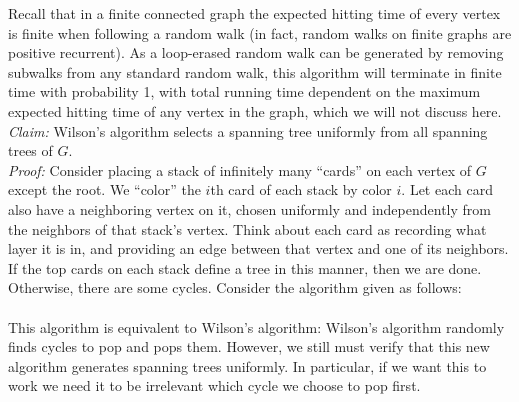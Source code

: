 \documentclass{article}
\begin{document}
	Recall that in a finite connected graph the expected hitting time of every vertex is finite when following a random walk (in fact, random walks on finite graphs are positive recurrent). As a loop-erased random walk can be generated by removing subwalks from any standard random walk, this algorithm will terminate in finite time with probability 1, with total running time dependent on the maximum expected hitting time of any vertex in the graph, which we will not discuss here. \\
	
	\textit{Claim:} Wilson's algorithm selects a spanning tree uniformly from all spanning trees of $G$.  \\ 
	
	\textit{Proof:} Consider placing a stack of infinitely many ``cards'' on each vertex of $G$ except the root. We ``color'' the $i$th card of each stack by color $i$. Let each card also have a neighboring vertex on it, chosen uniformly and independently from the neighbors of that stack's vertex. Think about each card as recording what layer it is in, and providing an edge between that vertex and one of its neighbors. \\ 
	
	If the top cards on each stack define a tree in this manner, then we are done. \\ 
	
	Otherwise, there are some cycles. Consider the algorithm given as follows: \\
	
	\\

	This algorithm is equivalent to Wilson's algorithm: Wilson's algorithm randomly finds cycles to pop and pops them. However, we still must verify that this new algorithm generates spanning trees uniformly. In particular, if we want this to work we need it to be irrelevant which cycle we choose to pop first. \\
	
\end{document}
